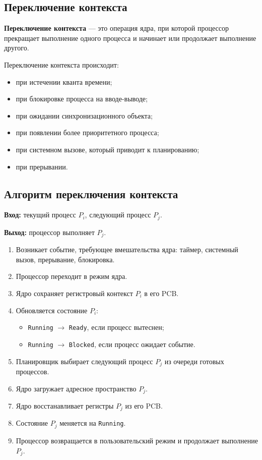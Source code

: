 \documentclass[12pt,a4paper]{article}
\begin{document}
\subsection{Переключение контекста}

\textbf{Переключение контекста} --- это операция ядра, при которой процессор прекращает выполнение одного процесса и начинает или продолжает выполнение другого.

Переключение контекста происходит:
\begin{itemize}
    \item при истечении кванта времени;
    \item при блокировке процесса на вводе-выводе;
    \item при ожидании синхронизационного объекта;
    \item при появлении более приоритетного процесса;
    \item при системном вызове, который приводит к планированию;
    \item при прерывании.
\end{itemize}

\subsection{Алгоритм переключения контекста}

\textbf{Вход:} текущий процесс $P_i$, следующий процесс $P_j$.

\textbf{Выход:} процессор выполняет $P_j$.

\begin{enumerate}
    \item Возникает событие, требующее вмешательства ядра: таймер, системный вызов, прерывание, блокировка.
    \item Процессор переходит в режим ядра.
    \item Ядро сохраняет регистровый контекст $P_i$ в его PCB.
    \item Обновляется состояние $P_i$:
    \begin{itemize}
        \item \texttt{Running} $\rightarrow$ \texttt{Ready}, если процесс вытеснен;
        \item \texttt{Running} $\rightarrow$ \texttt{Blocked}, если процесс ожидает событие.
    \end{itemize}
    \item Планировщик выбирает следующий процесс $P_j$ из очереди готовых процессов.
    \item Ядро загружает адресное пространство $P_j$.
    \item Ядро восстанавливает регистры $P_j$ из его PCB.
    \item Состояние $P_j$ меняется на \texttt{Running}.
    \item Процессор возвращается в пользовательский режим и продолжает выполнение $P_j$.
\end{enumerate}
\end{document}
